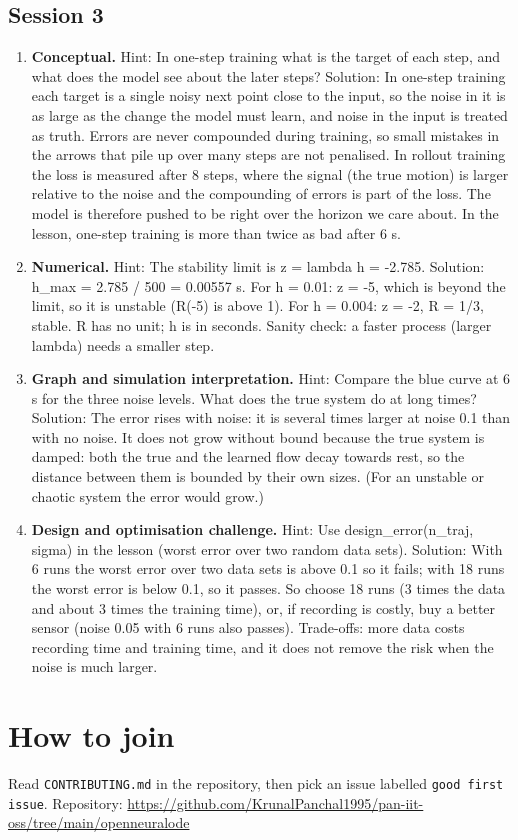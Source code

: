 \documentclass[11pt,a4paper]{article}
\begin{document}
\subsection*{Session 3}
\begin{enumerate}[nosep]
\item \textbf{Conceptual.} Hint: In one-step training what is the target of each step, and what does the model see about the later steps? Solution: In one-step training each target is a single noisy next point close to the input, so the noise in it is as large as the change the model must learn, and noise in the input is treated as truth. Errors are never compounded during training, so small mistakes in the arrows that pile up over many steps are not penalised. In rollout training the loss is measured after 8 steps, where the signal (the true motion) is larger relative to the noise and the compounding of errors is part of the loss. The model is therefore pushed to be right over the horizon we care about. In the lesson, one-step training is more than twice as bad after 6 s.
\item \textbf{Numerical.} Hint: The stability limit is z = lambda h = -2.785. Solution: h\_max = 2.785 / 500 = 0.00557 s. For h = 0.01: z = -5, which is beyond the limit, so it is unstable (\textbar{}R(-5)\textbar{} is above 1). For h = 0.004: z = -2, R = 1/3, stable. R has no unit; h is in seconds. Sanity check: a faster process (larger \textbar{}lambda\textbar{}) needs a smaller step.
\item \textbf{Graph and simulation interpretation.} Hint: Compare the blue curve at 6 s for the three noise levels. What does the true system do at long times? Solution: The error rises with noise: it is several times larger at noise 0.1 than with no noise. It does not grow without bound because the true system is damped: both the true and the learned flow decay towards rest, so the distance between them is bounded by their own sizes. (For an unstable or chaotic system the error would grow.)
\item \textbf{Design and optimisation challenge.} Hint: Use design\_error(n\_traj, sigma) in the lesson (worst error over two random data sets). Solution: With 6 runs the worst error over two data sets is above 0.1 so it fails; with 18 runs the worst error is below 0.1, so it passes. So choose 18 runs (3 times the data and about 3 times the training time), or, if recording is costly, buy a better sensor (noise 0.05 with 6 runs also passes). Trade-offs: more data costs recording time and training time, and it does not remove the risk when the noise is much larger.
\end{enumerate}

\section{How to join}
Read \texttt{CONTRIBUTING.md} in the repository, then pick an issue labelled \texttt{good first issue}. Repository: \url{https://github.com/KrunalPanchal1995/pan-iit-oss/tree/main/openneuralode}
\end{document}
